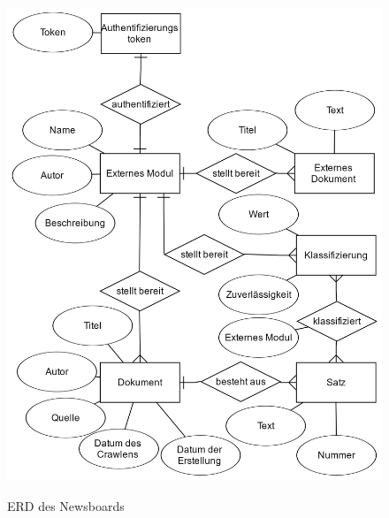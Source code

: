 \begin{figure}[h]
	\centering 
	\includegraphics[scale=0.175]{content/erd.png}
	\label{erd}
	\caption{ERD des Newsboards}
\end{figure}

